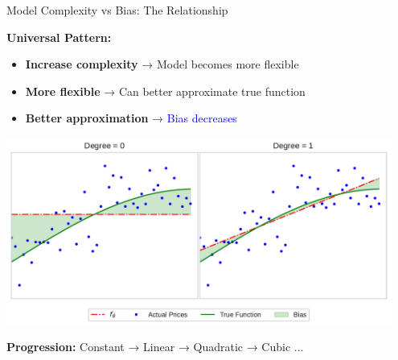 \documentclass[10pt]{beamer}
\newcommand{\fitpic}[1]{\begin{adjustbox}{max width=\linewidth, max totalheight=0.78\textheight}#1\end{adjustbox}}
\begin{document}
\begin{frame}{Model Complexity vs Bias: The Relationship}
\begin{keypointsbox}
\textbf{Universal Pattern:}
\begin{itemize}
\item \textbf{Increase complexity} → Model becomes more flexible
\item \textbf{More flexible} → Can better approximate true function
\item \textbf{Better approximation} → \textcolor{blue}{Bias decreases}
\end{itemize}
\end{keypointsbox}

\begin{center}
\fitpic{\includegraphics[width=0.95\textwidth]{../assets/bias-variance/figures/bias7.pdf}}
\end{center}

\begin{examplebox}
\textbf{Progression:} Constant → Linear → Quadratic → Cubic ...
\end{examplebox}
\end{frame}
\end{document}
